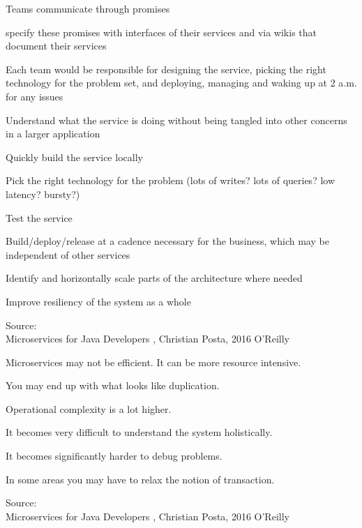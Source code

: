 \documentclass[Screen16to9,17pt]{foils}
\begin{document}


\begin{list2}
\item Teams communicate through promises
\item specify these promises with interfaces
of their services and via wikis that document their services
\item Each team would be responsible for designing the service, picking
the right technology for the problem set, and deploying, managing
and waking up at 2 a.m. for any issues
\item Understand what the service is doing without being tangled into
other concerns in a larger application
\item Quickly build the service locally
\item Pick the right technology for the problem (lots of writes? lots of
queries? low latency? bursty?)
\item Test the service
\item Build/deploy/release at a cadence necessary for the business,
which may be independent of other services
\item Identify and horizontally scale parts of the architecture where
needed
\item Improve resiliency of the system as a whole



\end{list2}
Source: {\footnotesize\\
Microservices for Java Developers , Christian Posta, 2016 O’Reilly}





\begin{list2}
\item Microservices may not be efficient. It can be more resource intensive.
\item You may end up with
what looks like duplication.
\item Operational complexity is a lot higher.
\item It becomes very difficult to understand the system holistically.
\item It becomes significantly harder to debug problems.
\item In some areas you may have to relax the notion of transaction.
\end{list2}
Source: {\footnotesize\\
Microservices for Java Developers , Christian Posta, 2016 O’Reilly}
\end{document}
